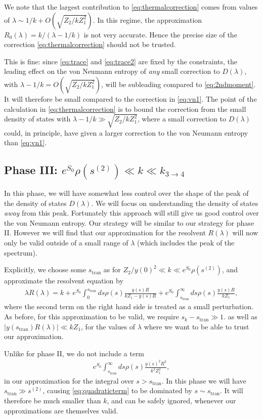 \documentclass[12pt]{article}
\newcommand{\stran}{s_{\text{tran}}}
\newcommand{\smax}{s_k}
\numberwithin{equation}{section}
\begin{document}
We note that the largest contribution to \eqref{eq:thermalcorrection} comes from values of $\lambda \sim 1/k + O(\sqrt{Z_2 / k Z_1^2})$. In this regime, the approximation $R_0 (\lambda) = k/(\lambda - 1/k)$ is not very accurate. Hence the precise size of the correction \eqref{eq:thermalcorrection} should not be trusted. 

This is fine: since \eqref{eq:trace} and \eqref{eq:trace2} are fixed by the constraints, the leading effect on the von Neumann entropy of \emph{any} small correction to $D(\lambda)$, with $\lambda - 1/k = O(\sqrt{Z_2 / k Z_1^2})$, will be subleading compared to \eqref{eq:2ndmoment}. It will therefore be small compared to the correction in \eqref{eq:vn1}. The point of the calculation in \eqref{eq:thermalcorrection} is to bound the correction from the small density of states with $\lambda - 1/k  \gg \sqrt{Z_2 / k Z_1^2}$, where a small correction to $D(\lambda)$ could, in principle, have given a larger correction to the von Neumann entropy than \eqref{eq:vn1}.

\subsection*{Phase III: $e^{S_0} \rho( s^{(2)}) \ll k \ll k_{3 \to 4}$}
In this phase, we will have somewhat less control over the shape of the peak of the density of states $D(\lambda)$. We will focus on understanding the density of states \emph{away} from this peak. Fortunately this approach will still give us good control over the von Neumann entropy. Our strategy will be similar to our strategy for phase II. However we will find that our approximation for the resolvent $R(\lambda)$ will now only be valid outside of a small range of $\lambda$ (which includes the peak of the spectrum). 

Explicitly, we choose some $\stran$ as for $Z_2/y(0)^2 \ll k \ll e^{S_0} \rho( s^{(2)})$, and approximate the resolvent equation by
\begin{align}
\lambda R(\lambda) = k  + e^{S_0}\int_0^{\stran} ds \rho(s) \frac{y(s) R}{k Z_1 - y(s) R} +  e^{S_0}\int_{\stran}^\infty ds \rho(s) \frac{y(s) R}{k Z_1} ,
\end{align}
where the second term on the right hand side is treated as a small perturbation. As before, for this approximation to be valid, we require $\smax - \stran \gg 1$. as well as $|y(\stran) R(\lambda)| \ll k Z_1$, for the values of $\lambda$ where we want to be able to trust our approximation.

Unlike for phase II, we do not include a term
\begin{align} \label{eq:quadraticterm}
e^{S_0}\int_{\stran}^\infty ds \rho(s) \frac{y(s)^2 R^2}{k^2 Z_1^2},
\end{align}
in our approximation for the integral over $s > \stran$. In this phase we will have $\stran \gg s^{(2)}$, causing \eqref{eq:quadraticterm} to be dominated by $s \sim \stran$. It will therefore be much smaller than $k$, and can be safely ignored, whenever our approximations are themselves valid.
\end{document}
